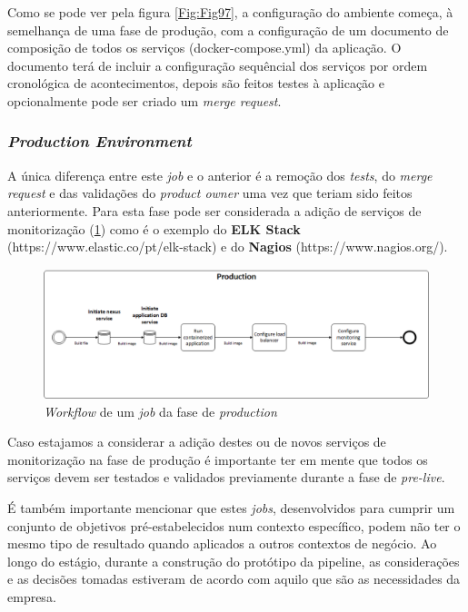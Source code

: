 \hspace{1cm}Como se pode ver pela figura \ref{Fig:Fig97}, a configuração do ambiente começa, à semelhança de uma fase de produção, com a configuração de um documento de composição de todos os serviços (docker-compose.yml) da aplicação. O documento terá de incluir a configuração sequêncial dos serviços por ordem cronológica de acontecimentos, depois são feitos testes à aplicação e opcionalmente pode ser criado um \textit{merge request}.

\subsubsection{\textit{Production Environment}}

\hspace{1cm} A única diferença entre este \textit{job} e o anterior é a remoção dos \textit{tests}, do \textit{merge request} e das validações do \textit{product owner} uma vez que teriam sido feitos anteriormente. Para esta fase pode ser considerada a adição de serviços de monitorização (\ref{Fig:Fig98}) como é o exemplo do \textbf{ELK Stack} (https://www.elastic.co/pt/elk-stack) e do \textbf{Nagios} (https://www.nagios.org/).

\begin{figure}[hbt!]
\centering
\includegraphics[width=0.8\linewidth]{Cap2/ProductionStage.png}
\caption{\textit{Workflow} de um \textit{job} da fase de \textit{production}}
\label{Fig:Fig98}
\end{figure}

\hspace{1cm}Caso estajamos a considerar a adição destes ou de novos serviços de monitorização na fase de produção é importante ter em mente que todos os serviços devem ser testados e validados previamente durante a fase de \textit{pre-live}. 

\hspace{1cm}É também importante mencionar que estes \textit{jobs}, desenvolvidos para cumprir um conjunto de objetivos pré-estabelecidos num contexto específico, podem não ter o mesmo tipo de resultado quando aplicados a outros contextos de negócio. Ao longo do estágio, durante a construção do protótipo da pipeline, as considerações e as decisões tomadas estiveram de acordo com aquilo que são as necessidades da empresa.
